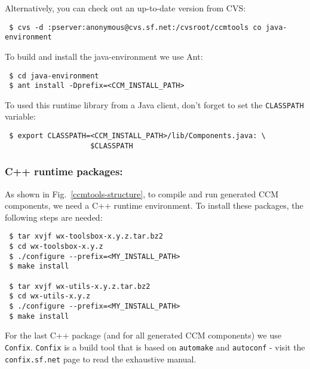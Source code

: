 Alternatively, you can check out an up-to-date version from CVS:
\begin{small}
\begin{verbatim}
 $ cvs -d :pserver:anonymous@cvs.sf.net:/cvsroot/ccmtools co java-environment
\end{verbatim}
\end{small}

To build and install the java-environment we use Ant:
\begin{small}
\begin{verbatim}
 $ cd java-environment
 $ ant install -Dprefix=<CCM_INSTALL_PATH>
\end{verbatim}
\end{small}

\noindent
To used this runtime library from a Java client, 
don't forget to set the {\tt CLASSPATH} variable:
\begin{small}
\begin{verbatim}
 $ export CLASSPATH=<CCM_INSTALL_PATH>/lib/Components.java: \
                    $CLASSPATH
\end{verbatim}
\end{small}



\subsubsection{C++ runtime packages:}
As shown in Fig.~\ref{ccmtools-structure}, to compile and run generated CCM
components, we need a C++ runtime environment.
To install these packages, the following steps are needed: 

\begin{small}
\begin{verbatim}
 $ tar xvjf wx-toolsbox-x.y.z.tar.bz2
 $ cd wx-toolsbox-x.y.z
 $ ./configure --prefix=<MY_INSTALL_PATH>
 $ make install

 $ tar xvjf wx-utils-x.y.z.tar.bz2
 $ cd wx-utils-x.y.z
 $ ./configure --prefix=<MY_INSTALL_PATH>
 $ make install     
\end{verbatim}
\end{small}

\noindent
For the last C++ package (and for all generated CCM components) we
use {\tt Confix}. 
{\tt Confix} is a build tool that is based on {\tt automake} and 
{\tt autoconf} - visit the {\tt confix.sf.net} page to read the
exhaustive manual. 


